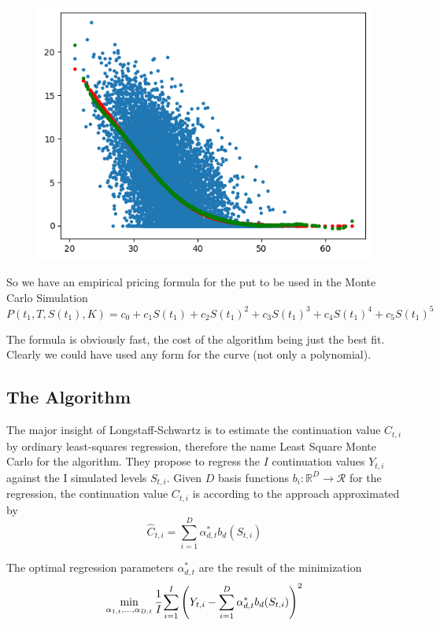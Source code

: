 \documentclass[12pt,a4paper]{book}
\begin{document}
\begin{figure}[htbp]
	\begin{center}
		\includegraphics[width=0.5\linewidth]{addons/continuation_function}
	\end{center}
	\label{fig:continuation_function}
\end{figure}

So we have an empirical pricing formula for the put to be used in the Monte Carlo Simulation
\begin{equation}
	P(t_1,T,S(t_1),K)=c_0+c_1 S(t_1) + c_2 S(t_1)^2 + c_3 S(t_1)^3 + c_4 S(t_1)^4 + c_5 S(t_1)^5
\end{equation}

The formula is obviously fast, the cost of the algorithm being just the best fit. Clearly we could have used any form for the curve (not only a polynomial). 

\subsection{The Algorithm}
The major insight of Longstaff-Schwartz is to estimate the continuation value $C_{t,i}$ by ordinary least-squares regression, therefore the name Least Square Monte Carlo for the algorithm. 
They propose to regress the $I$ continuation values $Y_{t,i}$ against the I simulated levels $S_{t,i}$. Given $D$ basis functions $b_i:\mathbb{R}^D\rightarrow\mathcal{R}$ for the regression, the continuation value $C_{t,i}$ is according to the approach approximated by
\begin{equation}
	\hat{C}_{t,i}=\sum_{i=1}^D \alpha^*_{d,t}b_d(S_{t,i})
	\label{eq:continuation_approx}
\end{equation}

The optimal regression parameters $\alpha^*_{d,t}$ are the result of the minimization
\begin{equation}
	\min_{\alpha_{1,t},\ldots,\alpha_{D,t}}\cfrac{1}{I}\sum_{i=1}^I \left(Y_{t,i}-\sum_{i=1}^D\alpha^*_{d,t}b_d(S_{t,i})\right)^2
	\label{eq:optimization_alphas}	
\end{equation}
\end{document}
